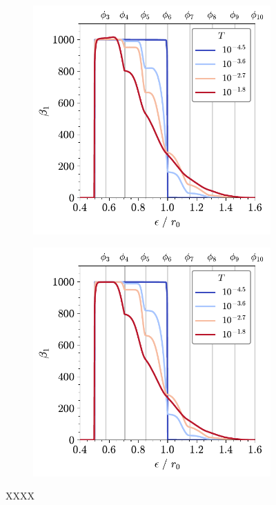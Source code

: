 \begin{figure}[tb]
	\centering
     
      \begin{subfigure}[b]{0.48\textwidth}
         \centering
         \includegraphics[width=\textwidth]{./figures/ph/tri_raft_beta1_full.pdf}
         \caption{}
         \label{fig:trpda}
     \end{subfigure}
     \hfill
     \begin{subfigure}[b]{0.48\textwidth}
         \centering
         \includegraphics[width=\textwidth]{./figures/ph/tri_raft_beta1_cut.pdf}
         \caption{}
         \label{fig:trpda}
     \end{subfigure}

	\caption{XXXX}
	\label{fig:}
\end{figure}

